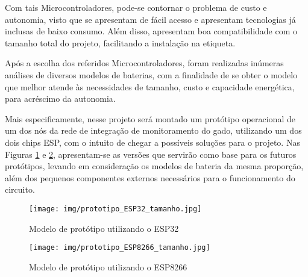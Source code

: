 {
Com tais Microcontroladores, pode-se contornar o problema de custo e autonomia, visto que se apresentam de fácil acesso e apresentam tecnologias já inclusas de baixo consumo. Além disso, apresentam boa compatibilidade com o tamanho total do projeto, facilitando a instalação na etiqueta.
}

{
Após a escolha dos referidos Microcontroladores, foram realizadas inúmeras análises de diversos modelos de baterias, com a finalidade de se obter o modelo que melhor atende às necessidades de tamanho, custo e capacidade energética, para acréscimo da autonomia. 
}

{
Mais especificamente, nesse projeto será montado um protótipo operacional de um dos nós da rede de integração de monitoramento do gado, utilizando um dos dois chips ESP, com o intuito de chegar a possíveis soluções para o projeto. Nas Figuras \ref{fig:prototipo_tamanho_esp32} e \ref{fig:prototipo_tamanho_esp8266}, apresentam-se as versões que servirão como base para os futuros protótipos, levando em consideração os modelos de bateria da mesma proporção, além dos pequenos componentes externos necessários para o funcionamento do circuito.
}

\begin{figure}[htp]
    \centering
    \texttt{[image: img/prototipo\_ESP32\_tamanho.jpg]}
    \caption{Modelo de protótipo utilizando o ESP32}
    \label{fig:prototipo_tamanho_esp32}
\end{figure}

\begin{figure}[htp]
    \centering
    \texttt{[image: img/prototipo\_ESP8266\_tamanho.jpg]}
    \caption{Modelo de protótipo utilizando o ESP8266}
    \label{fig:prototipo_tamanho_esp8266}
\end{figure}



